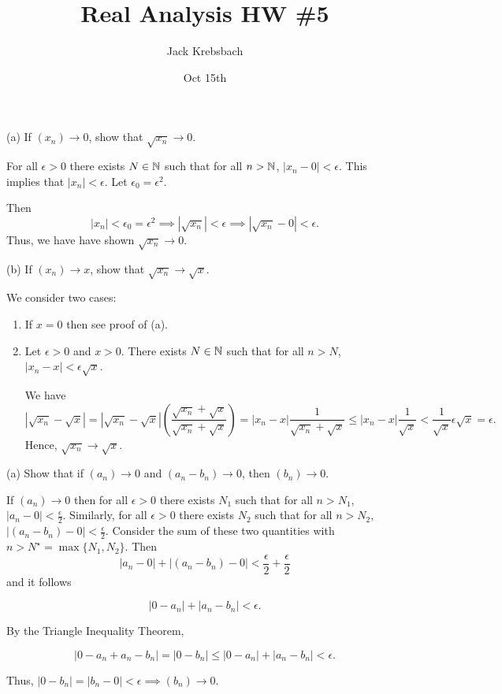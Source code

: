 \documentclass{report}
\title{Real Analysis HW \#5}
\author{Jack Krebsbach }
\date{Oct 15th}
\begin{document}
\maketitle
{}

\bigskip
(a) If $\left(x_n\right) \rightarrow 0$, show that $\sqrt{x_n} \rightarrow 0$.

\begin{myproof}
\bigskip
For all $\epsilon >0$ there exists $N \in \NN$ such that for all $n> \NN$, $|x_n - 0| < \epsilon.$
This implies that $|x_n| < \epsilon.$ Let $\epsilon_0 = \epsilon^2.$

Then $$|x_n| < \epsilon_0 = \epsilon^2 \implies |\sqrt{x_n}| < \epsilon  \implies  |\sqrt{x_n} - 0| < \epsilon.$$ Thus, we have have shown $\sqrt{x_n} \rightarrow 0.$
\end{myproof}

\bigskip
(b) If $\left(x_n\right) \rightarrow x$, show that $\sqrt{x_n} \rightarrow \sqrt{x}$.


\bigskip
\begin{myproof}
We consider two cases: 
\begin{enumerate}
  \item If $x = 0$ then see proof of (a).
  \item Let $\epsilon>0$ and $x > 0.$  There exists $N \in \NN$ such that for all $n > N$, $|x_n -x | < \epsilon \sqrt{x}$.

  We have $$ \left|\sqrt{x_n} -\sqrt{x} \right| = \left|\sqrt{x_n} -\sqrt{x} \right| \left(\frac{\sqrt{x_n} +\sqrt{x}}{\sqrt{x_n} + \sqrt{x}}  \right) = |x_n -x|\frac{1}{\sqrt{x_n} + \sqrt{x}} \leq |x_n -x|\frac{1}{\sqrt{x}}  < \frac{1}{\sqrt{x}}\epsilon\sqrt{x} = \epsilon. $$
Hence, $\sqrt{x_n} \rightarrow \sqrt{x}.$
\end{enumerate}
\end{myproof}

(a) Show that if $\left(a_n\right) \rightarrow 0$ and $\left(a_n-b_n\right) \rightarrow 0$, then $\left(b_n\right) \rightarrow 0$.
\begin{myproof}
    
  If $\left(a_n\right) \rightarrow 0$ then for all $\epsilon >0$ there exists $N_1$ such that for all $n> N_1$, $|a_n - 0| < \frac{\epsilon}{2}.$ Similarly, for all $\epsilon >0$ there exists $N_2$ such that for all $n > N_2$, $| (a_n - b_n) - 0 |< \frac{\epsilon}{2}.$ Consider the sum of these two quantities with $n >N^\star = \max\{N_1,N_2\}.$ Then 
$$| a_n  - 0 |+ | (a_n - b_n) - 0 |<  \frac{\epsilon}{2} + \frac{\epsilon}{2}$$ and it follows

$$| 0 - a_n |+ |a_n - b_n|<  \epsilon.$$

By the Triangle Inequality Theorem, 

$$|0 - a_n  + a_n - b_n| = |0 - b_n| \leq | 0 - a_n |+ |a_n - b_n|< \epsilon.$$

Thus, $|0 - b_n| = |b_n - 0 |< \epsilon \implies (b_n) \rightarrow 0.$

\end{myproof}
\end{document}
